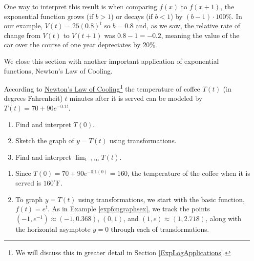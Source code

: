 \documentclass{ximera}
\begin{document}
 

One way to interpret this result is when comparing $f(x)$ to $f(x+1)$, the exponential function grows (if $b>1$) or decays (if $b<1$) by $(b-1) \cdot 100 \%$.  In our example, $V(t) = 25 (0.8)^{t}$ so $b = 0.8$ and, as we saw, the relative rate of change from $V(t)$ to $V(t+1)$ was $ 0.8 - 1= -0.2$, meaning the value of the car  over the course of one year depreciates by  $20 \%$.

 

We close this section with another important application of exponential functions,  Newton's Law of Cooling.

 

\begin{example}  \label{exptempex} According to \href{http://en.wikipedia.org/wiki/Heat_transfer#Newton.27s_law_of_cooling}{\underline{Newton's Law of Cooling}}\footnote{We will discuss this in greater detail in Section \ref{ExpLogApplications}.} the temperature of coffee $T(t)$ (in degrees Fahrenheit) $t$ minutes after it is served can be modeled by $T(t) = 70 + 90 e^{-0.1 t}$. 

\begin{enumerate}

\item  Find and interpret $T(0)$.

\item  Sketch the graph of $y = T(t)$ using transformations.

\item  Find and interpret $\lim_{t \rightarrow \infty} T(t)$.  

\end{enumerate}

\begin{explanation}

\begin{enumerate}

\item  Since $T(0) =70 + 90 e^{-0.1 (0)} = 160$,   the temperature of the coffee when it is served is $160^{\circ}\text{F}$.

\item  To graph $y = T(t)$ using transformations, we start with the basic function, $f(t)=e^{t}$.  As in Example \ref{expfcngraphsex}, we track the points $(-1, e^{-1}) \approx (-1, 0.368)$, $(0,1)$, and $(1, e) \approx (1, 2.718)$, along with the horizontal asymptote $y = 0$ through each of transformations.

 


\end{enumerate}
\end{explanation}
\end{example}
\end{document}
